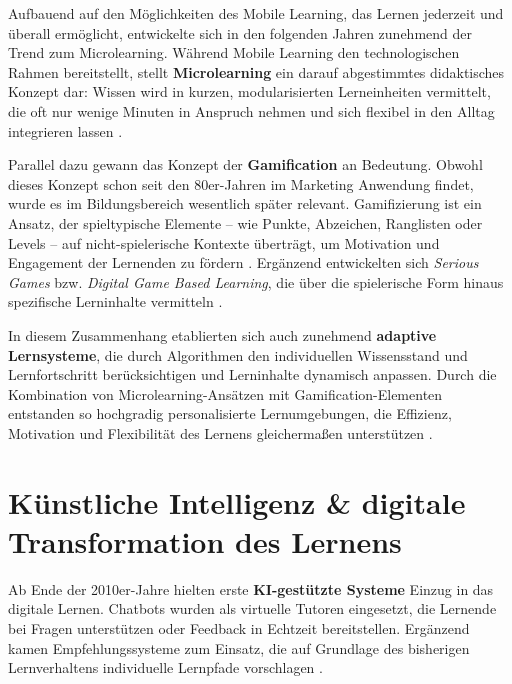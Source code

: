 {{Aufbauend auf den Möglichkeiten des Mobile Learning, das Lernen jederzeit und überall ermöglicht, entwickelte sich in den folgenden Jahren zunehmend der Trend zum Microlearning. Während Mobile Learning den technologischen Rahmen bereitstellt, stellt \textbf{Microlearning} ein darauf abgestimmtes didaktisches Konzept dar: Wissen wird in kurzen, modularisierten Lerneinheiten vermittelt, die oft nur wenige Minuten in Anspruch nehmen und sich flexibel in den Alltag integrieren lassen \parencites[S.~18--20]{hug_outline_2007}[S.~5--8]{buchem_microlearning_2010}. 

Parallel dazu gewann das Konzept der \textbf{Gamification} an Bedeutung. Obwohl dieses Konzept schon seit den 80er-Jahren im Marketing Anwendung findet, wurde es im Bildungsbereich wesentlich später relevant. Gamifizierung ist ein Ansatz, der spieltypische Elemente – wie Punkte, Abzeichen, Ranglisten oder Levels – auf nicht-spielerische Kontexte überträgt, um Motivation und Engagement der Lernenden zu fördern \parencite[S.~452]{schlag_gamifizierung_2021}. Ergänzend entwickelten sich \textit{Serious Games} bzw. \textit{Digital Game Based Learning}, die über die spielerische Form hinaus spezifische Lerninhalte vermitteln \parencite[S.~14]{niegemann_kompendium_2008}.

In diesem Zusammenhang etablierten sich auch zunehmend \textbf{adaptive Lernsysteme}, die durch Algorithmen den individuellen Wissensstand und Lernfortschritt berücksichtigen und Lerninhalte dynamisch anpassen. Durch die Kombination von Microlearning-Ansätzen mit Gamification-Elementen entstanden so hochgradig personalisierte Lernumgebungen, die Effizienz, Motivation und Flexibilität des Lernens gleichermaßen unterstützen \parencite[S.~1f]{katsaris_adaptive_2021}.

\section{Künstliche Intelligenz \& digitale Transformation des Lernens}

Ab Ende der 2010er-Jahre hielten erste \textbf{KI-gestützte Systeme} Einzug in das digitale Lernen. Chatbots wurden als virtuelle Tutoren eingesetzt, die Lernende bei Fragen unterstützen oder Feedback in Echtzeit bereitstellen. Ergänzend kamen Empfehlungssysteme zum Einsatz, die auf Grundlage des bisherigen Lernverhaltens individuelle Lernpfade vorschlagen \parencites[S.~1f]{harry_role_2023}[S.~42ff]{zhai_review_2021}.

}}
